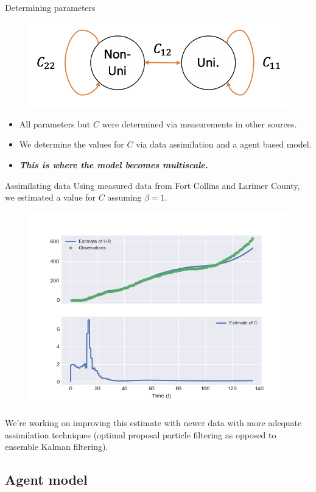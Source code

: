\documentclass[aspectratio=169]{beamer}
\newcommand\boldgreen[1]{\textcolor{lighter_csu_green}{\emph{\textbf{#1}}}}
\begin{document}
\begin{frame}{Determining parameters}
    \vfill
    \pause
        \begin{figure}[H]
            \centering
            \includegraphics[width=.5\textwidth]{figures/contact_diagram.png}
        \end{figure}
    \begin{itemize}
\item    All parameters but $C$ were determined via measurements in other sources.
\pause
\item We determine the values for $C$ via data assimilation and a agent based model.
\pause
\item \boldgreen{This is where the model becomes multiscale.}
    \end{itemize}
\end{frame}

\begin{frame}{Assimilating data}
    \vfill
    \pause
    Using measured data from Fort Collins and Larimer County, we estimated a value for $C$ assuming $\beta=1$.
    \begin{figure}[H]
    \centering
    \includegraphics[width=.6\textwidth]{figures/data_assimilation.png}
    \end{figure}
    \pause
    We're working on improving this estimate with newer data with more adequate assimilation techniques (optimal proposal particle filtering as opposed to ensemble Kalman filtering).
    \vfill
\end{frame}

\subsection{Agent model}
\end{document}
